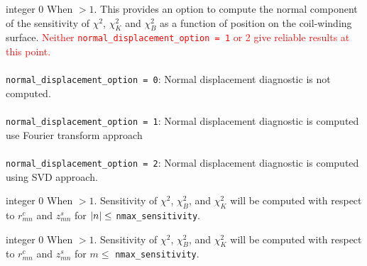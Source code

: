 {integer}
{0}
{When  $>1$.}
{This provides an option to compute the normal component of the sensitivity of $\chi^2$, $\chi^2_K$ and $\chi^2_B$ as a function of position on the coil-winding surface. \textcolor{red}{Neither \texttt{normal\_displacement\_option = 1} or 2 give reliable results at this point.} \\ \\ 
\texttt{normal\_displacement\_option = 0}: Normal displacement diagnostic is not computed. \\ \\
\texttt{normal\_displacement\_option = 1}: Normal displacement diagnostic is computed use Fourier transform approach \\ \\
\texttt{normal\_displacement\_option = 2}: Normal displacement diagnostic is computed using SVD approach.}

\myhrule

{integer}
{0}
{When  $> 1$.}
{Sensitivity of $\chi^2$, $\chi^2_B$, and $\chi^2_K$ will be computed with respect to $r_{mn}^c$ and $z_{mn}^s$ for $\abs{n} \leq $ \texttt{nmax\_sensitivity}.}

\myhrule

{integer}
{0}
{When  $> 1$.}
{Sensitivity of $\chi^2$, $\chi^2_B$, and $\chi^2_K$ will be computed with respect to $r_{mn}^c$ and $z_{mn}^s$ for $m \leq $ \texttt{nmax\_sensitivity}.}